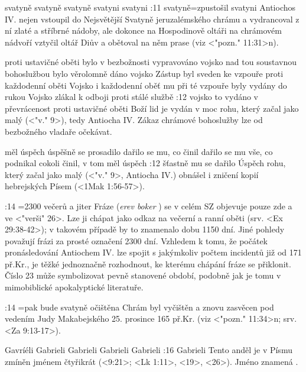     {svatyně} %
    {svatyně}  %
    {svatyně} %
    {svatyni}  %
    {svatyni}  %
:11 {svatyně}={zpustošil svatyni} Antiochos IV. nejen vstoupil do Nejsvětější Svatyně jeruzalémského chrámu a vydrancoval z ní zlaté a stříbrné nádoby, ale dokonce na Hospodinově oltáři na chrámovém nádvoří vztyčil oltář Diův a obětoval na něm prase (viz <"pozn." 11:31>n).

   {proti ustavičné oběti bylo v bezbožnosti vypravováno vojsko}   %
   {nad tou soustavnou bohoslužbou bylo věrolomně dáno vojsko}   %
   {Zástup byl sveden ke vzpouře proti každodenní oběti}   %
   {Vojsko i každodenní oběť mu při té vzpouře byly vydány do rukou}   %
   {Vojsko zlákal k odboji proti stálé službě}   %
:12 {vojsko to vydáno v převrácenost proti ustavičné oběti} Boží lid je vydán v moc rohu, který začal jako malý (<"v." 9>), tedy Antiocha IV. Zákaz chrámové bohoslužby lze od bezbožného vladaře očekávat.

   {měl úspěch}   %
   {úspěšně se prosadilo}   %
   {dařilo se mu, co činil}   %
   {dařilo se mu vše, co podnikal}   %
   {cokoli činil, v tom měl úspěch}   %
:12 {šťastně mu se dařilo} Úspěch rohu, který začal jako malý (<"v." 9>, Antiocha IV.)
obnášel i zničení kopií hebrejských Písem  (<1Mak 1:56-57>). 

:14 {}={2300 večerů a jiter} Fráze  ({\it erev boker\/} \ErevBoker) se v celém SZ objevuje pouze zde a ve <"verši" 26>. Lze ji chápat jako odkaz na večerní a ranní oběti (srv. <Ex 29:38-42>); v takovém případě by to znamenalo dobu 1150 dní. Jiné pohledy považují frázi za prosté označení 2300 dní. Vzhledem k tomu, že počátek pronásledování Antiochem IV. lze spojit s jakýmkoliv počtem incidentů již od 171 př.Kr., je těžké jednoznačně rozhodnout, ke kterému chápání fráze se přiklonit.
Číslo 23 může symbolizovat pevně stanovené období, podobně jak je tomu v mimobiblické apokalyptické literatuře.

:14 {}={pak bude svatyně očištěna}  Chrám byl vyčištěn a znovu zasvěcen pod vedením Judy Makabejského 25. prosince 165 př.Kr. (viz <"pozn." 11:34>n; srv. <Za 9:13-17>).

   {Gavríéli}   %
   {Gabrieli}   %
   {Gabrieli}   %
   {Gabrieli}   %
   {Gabrieli}   %
:16 {Gabrieli} Tento anděl je v Písmu zmíněn jménem čtyřikrát (<9:21>; <Lk 1:11>, <19>, <26>). Jméno znamená .

